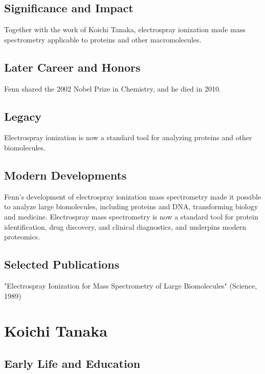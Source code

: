 \subsection*{Significance and Impact}

Together with the work of Koichi Tanaka, electrospray ionization made mass spectrometry applicable to proteins and other macromolecules.

\subsection*{Later Career and Honors}

Fenn shared the 2002 Nobel Prize in Chemistry, and he died in 2010.

\subsection*{Legacy}

Electrospray ionization is now a standard tool for analyzing proteins and other biomolecules.

\subsection*{Modern Developments}

Fenn's development of electrospray ionization mass spectrometry made it possible to analyze large biomolecules, including proteins and DNA, transforming biology and medicine. Electrospray mass spectrometry is now a standard tool for protein identification, drug discovery, and clinical diagnostics, and underpins modern proteomics.

\subsection*{Selected Publications}

"Electrospray Ionization for Mass Spectrometry of Large Biomolecules" (Science, 1989)

\clearpage

\section{Koichi Tanaka}

\subsection*{Early Life and Education}

